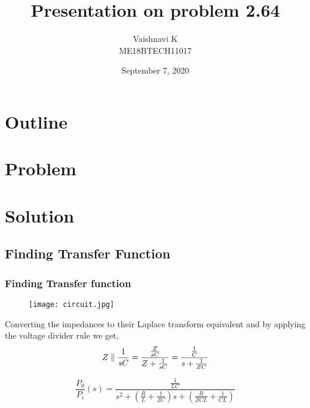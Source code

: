 \documentclass{beamer}
\title{Presentation on problem 2.64}
\author{ Vaishnavi K\\ ME18BTECH11017}
\date{September 7, 2020}
\theoremstyle{remark}
\numberwithin{equation}{section}
\begin{document}
\begin{frame}
\titlepage
\end{frame}

\section*{Outline}
\begin{frame}
\tableofcontents
\end{frame}

\section{Problem}

\section{Solution}
\subsection{Finding Transfer Function} 
\begin{frame}
\frametitle{Finding Transfer function }
\begin{figure}
\centering
\texttt{[image: circuit.jpg]}
\label{fig:circle_diameter}
\end{figure}
Converting the impedances to their Laplace transform equivalent and by applying the voltage divider rule we get,
\begin{equation} 
\centering
 Z  \parallel \frac{1}{sC} =
\frac{\frac{Z}{sC}}{Z+\frac{1}{sC}} =\frac{\frac{1}{C}}{s + \frac{1}{ZC}}
\end{equation}

\begin{equation}
\frac{P_{0}}{P_{i}} \left ( s\right) = 
\frac{\frac{1}{LC}}{ s^2 + \left( \frac{R}{L} + \frac{1}{ZC}\right)s + \left( \frac{R}{ZCL} + \frac{1}{CL} \right)}
\end{equation}

\end{frame}
\end{document}
